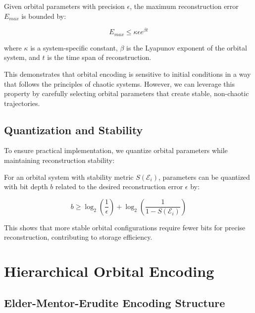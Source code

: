 \begin{theorem}
Given orbital parameters with precision $\epsilon$, the maximum reconstruction error $E_{max}$ is bounded by:

\begin{equation}
E_{max} \leq \kappa \epsilon e^{\beta t}
\end{equation}

where $\kappa$ is a system-specific constant, $\beta$ is the Lyapunov exponent of the orbital system, and $t$ is the time span of reconstruction.
\end{theorem}

This demonstrates that orbital encoding is sensitive to initial conditions in a way that follows the principles of chaotic systems. However, we can leverage this property by carefully selecting orbital parameters that create stable, non-chaotic trajectories.

\subsection{Quantization and Stability}

To ensure practical implementation, we quantize orbital parameters while maintaining reconstruction stability:

\begin{proposition}
For an orbital system with stability metric $S(\mathcal{E}_i)$, parameters can be quantized with bit depth $b$ related to the desired reconstruction error $\epsilon$ by:

\begin{equation}
b \geq \log_2\left(\frac{1}{\epsilon}\right) + \log_2\left(\frac{1}{1 - S(\mathcal{E}_i)}\right)
\end{equation}
\end{proposition}

This shows that more stable orbital configurations require fewer bits for precise reconstruction, contributing to storage efficiency.

\section{Hierarchical Orbital Encoding}

\subsection{Elder-Mentor-Erudite Encoding Structure}

